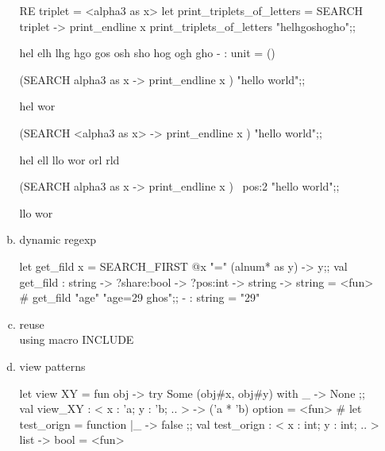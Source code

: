 \begin{enumerate}
\begin{enumerate}[(a)]
\begin{redcode}
RE triplet = <alpha{3} as x>
let print_triplets_of_letters = SEARCH triplet -> print_endline x
print_triplets_of_letters "helhgoshogho";;
\end{redcode}
\begin{bluecode}
hel
elh
lhg
hgo
gos
osh
sho
hog
ogh
gho
- : unit = ()
\end{bluecode}
\begin{redcode}
(SEARCH alpha{3} as x -> print_endline x ) "hello world";;
\end{redcode}

\begin{bluecode}
hel
wor
\end{bluecode}
\begin{redcode}
(SEARCH <alpha{3} as x> -> print_endline x ) "hello world";;
\end{redcode}
\begin{bluecode}
hel
ell
llo
wor
orl
rld
\end{bluecode}
\begin{redcode}
(SEARCH alpha{3} as x -> print_endline x ) ~pos:2 "hello world";;
\end{redcode}
\begin{bluecode}
llo
wor
\end{bluecode}





\item dynamic regexp 

  \begin{alternate}
let get_fild x = SEARCH_FIRST @x "=" (alnum* as y) -> y;;
val get_fild : string -> ?share:bool -> ?pos:int -> string -> string = <fun>
# get_fild "age" "age=29 ghos";;
- : string = "29"    
\end{alternate}



\item reuse \\ 
  using macro INCLUDE 

\item view patterns
  
  \begin{bluecode}
let view XY = fun obj -> try Some (obj#x, obj#y) with _ -> None ;;
val view_XY : < x : 'a; y : 'b; .. > -> ('a * 'b) option = <fun>
# let test_orign = function 
  |_ -> false 
;;
      val test_orign : < x : int; y : int; .. > list -> bool = <fun>    



\end{bluecode}
\end{enumerate}
\end{enumerate}
